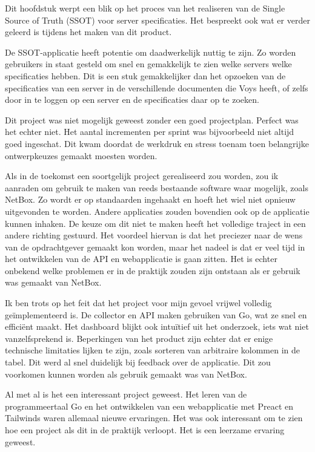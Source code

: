 \documentclass[../report.tex]{subfiles}
\begin{document}
Dit hoofdstuk werpt een blik op het proces van het realiseren van de Single Source of Truth (\gls*{SSOT}) voor server specificaties. Het bespreekt ook wat er verder geleerd is tijdens het maken van dit product.

De \gls*{SSOT}-applicatie heeft potentie om daadwerkelijk nuttig te zijn. Zo worden gebruikers in staat gesteld om snel en gemakkelijk te zien welke servers welke specificaties hebben. Dit is een stuk gemakkelijker dan het opzoeken van de specificaties van een server in de verschillende documenten die Voys heeft, of zelfs door in te loggen op een server en de specificaties daar op te zoeken.

Dit project was niet mogelijk geweest zonder een goed projectplan. Perfect was het echter niet. Het aantal incrementen per \gls*{sprint} was bijvoorbeeld niet altijd goed ingeschat. Dit kwam doordat de werkdruk en stress toenam toen belangrijke ontwerpkeuzes gemaakt moesten worden.

Als in de toekomst een soortgelijk project gerealiseerd zou worden, zou ik aanraden om gebruik te maken van reeds bestaande software waar mogelijk, zoals NetBox. Zo wordt er op standaarden ingehaakt en hoeft het wiel niet opnieuw uitgevonden te worden. Andere applicaties zouden bovendien ook op de applicatie kunnen inhaken. De keuze om dit niet te maken heeft het volledige traject in een andere richting gestuurd. Het voordeel hiervan is dat het preciezer naar de wens van de opdrachtgever gemaakt kon worden, maar het nadeel is dat er veel tijd in het ontwikkelen van de API en webapplicatie is gaan zitten. Het is echter onbekend welke problemen er in de praktijk zouden zijn ontstaan als er gebruik was gemaakt van NetBox.

Ik ben trots op het feit dat het project voor mijn gevoel vrijwel volledig geïmplementeerd is. De collector en API maken gebruiken van \gls*{Go}, wat ze snel en efficiënt maakt. Het dashboard blijkt ook intuïtief uit het onderzoek, iets wat niet vanzelfsprekend is. Beperkingen van het product zijn echter dat er enige technische limitaties lijken te zijn, zoals sorteren van arbitraire kolommen in de tabel. Dit werd al snel duidelijk bij feedback over de applicatie. Dit zou voorkomen kunnen worden als gebruik gemaakt was van NetBox.

Al met al is het een interessant project geweest. Het leren van de programmeertaal \gls*{Go} en het ontwikkelen van een webapplicatie met \gls*{Preact} en \gls*{Tailwinds} waren allemaal nieuwe ervaringen. Het was ook interessant om te zien hoe een project als dit in de praktijk verloopt. Het is een leerzame ervaring geweest.
\end{document}
